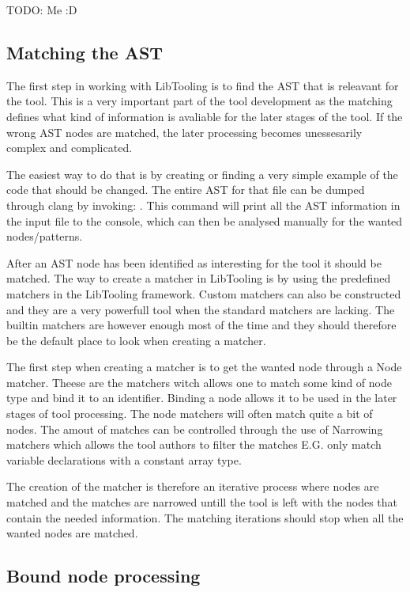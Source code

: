 TODO: Me :D

\subsection{Matching the AST} \label{subsec:080dev:ASTNodeMatching}

The first step in working with LibTooling is to find the AST that is releavant for the tool. This is a very important part of the tool development as the matching defines what kind of information is avaliable for the later stages of the tool. If the wrong AST nodes are matched, the later processing becomes unessesarily complex and complicated.

The easiest way to do that is by creating or finding a very simple example of the code that should be changed. The entire AST for that file can be dumped through clang by invoking: . 
This command will print all the AST information in the input file to the console, which can then be analysed manually for the wanted nodes/patterns.

After an AST node has been identified as interesting for the tool it should be matched. The way to create a matcher in LibTooling is by using the predefined matchers in the LibTooling framework.\cite{ASTMatcherReference} Custom matchers can also be constructed and they are a very powerfull tool when the standard matchers are lacking. The builtin matchers are however enough most of the time and they should therefore be the default place to look when creating a matcher. 

The first step when creating a matcher is to get the wanted node through a Node matcher. Theese are the matchers witch allows one to match some kind of node type and bind it to an identifier. Binding a node allows it to be used in the later stages of tool processing. The node matchers will often match quite a bit of nodes. The amout of matches can be controlled through the use of Narrowing matchers which allows the tool authors to filter the matches E.G. only match variable declarations with a constant array type.

The creation of the matcher is therefore an iterative process where nodes are matched and the matches are narrowed untill the tool is left with the nodes that contain the needed information. The matching iterations should stop when all the wanted nodes are matched.


\subsection{Bound node processing} \label{subsec:080dev:BoundNodeProcessing}

